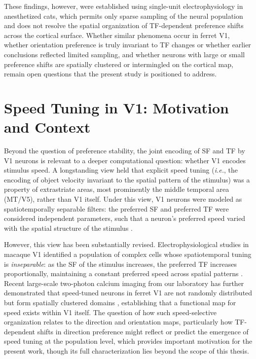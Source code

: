 \documentclass{brandeis-thesis3.3}
\begin{document}
These findings, however, were established using single-unit
electrophysiology in anesthetized cats, which permits only sparse
sampling of the neural population and does not resolve the spatial
organization of TF-dependent preference shifts across the cortical
surface. Whether similar phenomena occur in ferret V1, whether
orientation preference is truly invariant to TF changes or whether
earlier conclusions reflected limited sampling, and whether neurons
with large or small preference shifts are spatially clustered or
intermingled on the cortical map, remain open questions that the
present study is positioned to address.

\section{Speed Tuning in V1: Motivation and Context}

Beyond the question of preference stability, the joint encoding of SF
and TF by V1 neurons is relevant to a deeper computational question:
whether V1 encodes stimulus speed. A longstanding view held that
explicit speed tuning (\textit{i.e.}, the encoding of object velocity invariant to the
spatial pattern of the stimulus) was a property of extrastriate areas,
most prominently the middle temporal area (MT/V5), rather than V1
itself. Under this view, V1 neurons were modeled as spatiotemporally
separable filters: the preferred SF and preferred TF were considered
independent parameters, such that a neuron's preferred speed varied with
the spatial structure of the stimulus \citep{Priebe2006}.

However, this view has been substantially revised. Electrophysiological
studies in macaque V1 identified a population of complex cells whose
spatiotemporal tuning is \textit{inseparable}: as the SF of the
stimulus increases, the preferred TF increases proportionally,
maintaining a constant preferred speed across spatial patterns
\citep{Priebe2006}. Recent large-scale two-photon calcium imaging from
our laboratory has further demonstrated that speed-tuned neurons in
ferret V1 are not randomly distributed but form spatially clustered
domains \citep{Casanova2025}, establishing that a functional map for
speed exists within V1 itself. The question of how such speed-selective
organization relates to the direction and orientation maps,
particularly how TF-dependent shifts in direction preference might
reflect or predict the emergence of speed tuning at the population
level, which provides important motivation for the present work, though its
full characterization lies beyond the scope of this thesis.
\end{document}
